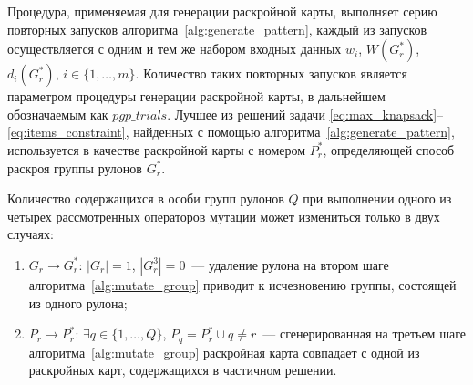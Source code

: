 \documentclass[12pt]{article}
\begin{document}
Процедура, применяемая для генерации раскройной карты, выполняет серию 
повторных запусков алгоритма~\ref{alg:generate_pattern}, 
каждый из запусков осуществляется с одним и тем же набором входных 
данных $w_i$, $W(G_r^*)$, $d_i(G_r^*)$, $i \in \{1,\ldots,m\}$. Количество 
таких повторных запусков является параметром процедуры генерации раскройной 
карты, в дальнейшем обозначаемым как $pgp\_trials$. Лучшее из решений задачи 
\eqref{eq:max_knapsack}--\eqref{eq:items_constraint}, 
найденных с помощью алгоритма~\ref{alg:generate_pattern}, 
используется в качестве раскройной карты с номером $P_r^*$, определяющей 
способ раскроя группы рулонов $G_r^*$.

Количество содержащихся в особи групп рулонов $Q$ при выполнении одного из 
четырех рассмотренных операторов мутации может измениться только в двух 
случаях:
\begin{enumerate}
    \item $G_r \rightarrow G_r^*$: $|G_r|=1$, $|G_r^3|=0$~--- удаление рулона 
    на втором шаге алгоритма~\ref{alg:mutate_group} приводит к исчезновению 
    группы, состоящей из одного рулона;
    \item $P_r \rightarrow P_r^*$: $\exists q \in \{1,\ldots,Q\}$, 
        $P_q=P_r^* \cup q \neq r$~--- 
    сгенерированная на третьем шаге алгоритма~\ref{alg:mutate_group} 
    раскройная карта совпадает с одной из раскройных карт, содержащихся в 
    частичном решении.
\end{enumerate}
\end{document}
